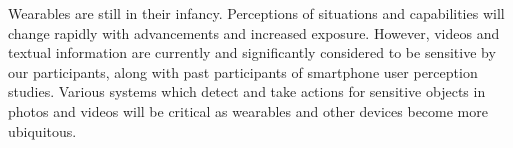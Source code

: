 Wearables are still in their infancy. Perceptions of situations and capabilities will change rapidly with advancements and increased exposure. However, videos and textual information are currently and significantly considered to be sensitive by our participants, along with past participants of smartphone user perception studies. Various systems which detect and take actions for sensitive objects in photos and videos will be critical as wearables and other devices become more ubiquitous.